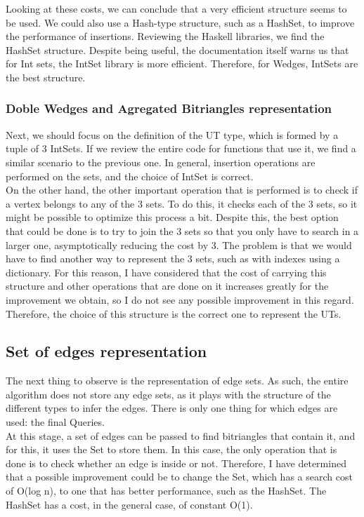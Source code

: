 Looking at these costs, we can conclude that a very efficient structure seems to be used.
We could also use a Hash-type structure, such as a HashSet, to improve the performance of insertions.
Reviewing the Haskell libraries, we find the HashSet structure.
Despite being useful, the documentation itself warns us that for Int sets, the IntSet library is more efficient.
Therefore, for Wedges, IntSets are the best structure.

\subsubsection*{Doble Wedges and Agregated Bitriangles representation}
Next, we should focus on the definition of the UT type, which is formed by a tuple of 3 IntSets.
If we review the entire code for functions that use it, we find a similar scenario to the previous one.
In general, insertion operations are performed on the sets, and the choice of IntSet is correct. \\

On the other hand, the other important operation that is performed is to check if a vertex belongs to any of the 3 sets.
To do this, it checks each of the 3 sets, so it might be possible to optimize this process a bit.
Despite this, the best option that could be done is to try to join the 3 sets so that you only have to search in a larger one, asymptotically reducing the cost by 3.
The problem is that we would have to find another way to represent the 3 sets, such as with indexes using a dictionary.
For this reason, I have considered that the cost of carrying this structure and other operations that are done on it increases greatly for the improvement we obtain, so I do not see any possible improvement in this regard. \\

Therefore, the choice of this structure is the correct one to represent the UTs.

\subsection{Set of edges representation}
The next thing to observe is the representation of edge sets.
As such, the entire algorithm does not store any edge sets, as it plays with the structure of the different types to infer the edges.
There is only one thing for which edges are used: the final Queries. \\

At this stage, a set of edges can be passed to find bitriangles that contain it, and for this, it uses the Set to store them.
In this case, the only operation that is done is to check whether an edge is inside or not.
Therefore, I have determined that a possible improvement could be to change the Set, which has a search cost of O(log n), to one that has better performance, such as the HashSet.
The HashSet has a cost, in the general case, of constant O(1). \\

